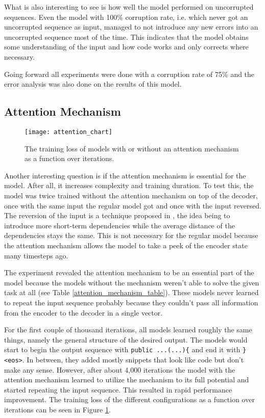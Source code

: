 What is also interesting to see is how well the model performed on uncorrupted sequences. Even the model with 100\% corruption rate, i.e. which never got an uncorrupted sequence as input, managed to not introduce any new errors into an uncorrupted sequence most of the time. This indicates that the model obtains some understanding of the input and how code works and only corrects where necessary.

Going forward all experiments were done with a corruption rate of 75\% and the error analysis was also done on the results of this model.

\subsection{Attention Mechanism}

\begin{figure}[p]
\centering
\texttt{[image: attention\_chart]}
\caption{The training loss of models with or without an attention mechanism as a function over iterations.}
\label{attention_chart}
\end{figure}

Another interesting question is if the attention mechanism is essential for the model. After all, it increases complexity and training duration. To test this, the model was twice trained without the attention mechanism on top of the decoder, once with the same input the regular model got and once with the input reversed. The reversion of the input is a technique proposed in \cite{seq2seq}, the idea being to introduce more short-term dependencies while the average distance of the dependencies stays the same. This is not necessary for the regular model because the attention mechanism allows the model to take a peek of the encoder state many timesteps ago.

The experiment revealed the attention mechanism to be an essential part of the model because the models without the mechanism weren't able to solve the given task at all (see Table \ref{attention_mechanism_table}). These models never learned to repeat the input sequence probably because they couldn't pass all information from the encoder to the decoder in a single vector.

For the first couple of thousand iterations, all models learned roughly the same things, namely the general structure of the desired output. The models would start to begin the output sequence with \texttt{public ...(...)\{} and end it with \texttt{\}<eos>}. In between, they added mostly snippets that look like code but don't make any sense. However, after about 4,000 iterations the model with the attention mechanism learned to utilize the mechanism to its full potential and started repeating the input sequence. This resulted in rapid performance improvement. The training loss of the different configurations as a function over iterations can be seen in Figure \ref{attention_chart}.

